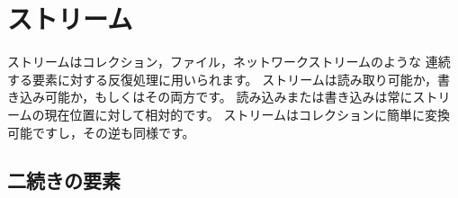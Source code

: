 \documentclass[a4paper,10pt,twoside]{book}
\begin{document}
	\renewcommand{\nnbb}[2]{} %
	\sloppy
\fi
\chapter{ストリーム}



ストリームはコレクション，ファイル，ネットワークストリームのような
連続する要素に対する反復処理に用いられます。
ストリームは読み取り可能か，書き込み可能か，もしくはその両方です。
読み込みまたは書き込みは常にストリームの現在位置に対して相対的です。
ストリームはコレクションに簡単に変換可能ですし，その逆も同様です。



\section{二続きの要素}
\end{document}

